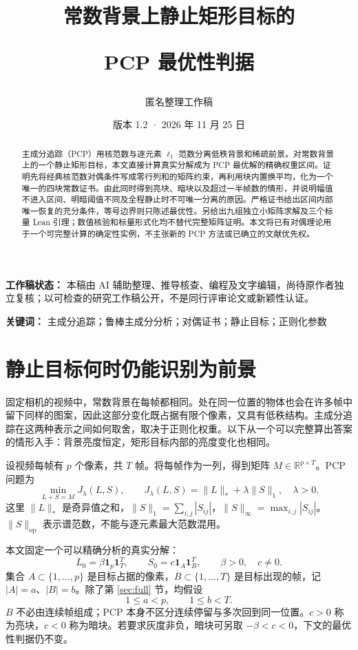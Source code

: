 \documentclass[UTF8,fontset=none,zihao=-4,a4paper]{ctexart}
\title{\vspace{-1.3em}\bfseries 常数背景上静止矩形目标的\par PCP 最优性判据}
\author{匿名整理工作稿}
\date{版本 1.2 · 2026 年 11 月 25 日}
\theoremstyle{plainzh}
\newcommand{\R}{\mathbb R}
\newcommand{\one}{\bm 1}
\newcommand{\nuc}[1]{\lVert #1\rVert_*}
\newcommand{\op}[1]{\lVert #1\rVert_{\mathrm{op}}}
\newcommand{\ellone}[1]{\lVert #1\rVert_1}
\newcommand{\maxnorm}[1]{\lVert #1\rVert_\infty}
\numberwithin{equation}{section}
\begin{document}
\maketitle
\noindent\textbf{工作稿状态：} 本稿由 AI 辅助整理、推导核查、编程及文字编辑，尚待原作者独立复核；以可检查的研究工作稿公开，不是同行评审论文或新颖性认证。\par\medskip
\begin{abstract}
主成分追踪（PCP）用核范数与逐元素 $\ell_1$ 范数分离低秩背景和稀疏前景。对常数背景上的一个静止矩形目标，本文直接计算真实分解成为 PCP 最优解的精确权重区间。证明先将经典核范数对偶条件写成零行列和的矩阵约束，再利用块内置换平均，化为一个唯一的四块常数证书。由此同时得到亮块、暗块以及超过一半帧数的情形，并说明幅值不进入区间、明暗阈值不同及全程静止时不可唯一分离的原因。严格证书给出区间内部唯一恢复的充分条件，等号边界则只陈述最优性。另给出九组独立小矩阵求解及三个标量 Lean 引理；数值核验和标量形式化均不替代完整矩阵证明。本文将已有对偶理论用于一个可完整计算的确定性实例，不主张新的 PCP 方法或已确立的文献优先权。
\end{abstract}
\noindent\textbf{关键词：} 主成分追踪；鲁棒主成分分析；对偶证书；静止目标；正则化参数

\section{静止目标何时仍能识别为前景}
固定相机的视频中，常数背景在每帧都相同。处在同一位置的物体也会在许多帧中留下同样的图案，因此这部分变化既占据有限个像素，又具有低秩结构。主成分追踪在这两种表示之间如何取舍，取决于正则化权重。以下从一个可以完整算出答案的情形入手：背景亮度恒定，矩形目标内部的亮度变化也相同。

设视频每帧有 $p$ 个像素，共 $T$ 帧。将每帧作为一列，得到矩阵 $M\in\R^{p\times T}$。PCP 问题为
\begin{equation}\label{eq:pcp}
 \min_{L+S=M}J_\lambda(L,S),\qquad
 J_\lambda(L,S)=\nuc L+\lambda\ellone S,\quad \lambda>0.
\end{equation}
这里 $\nuc L$ 是奇异值之和，$\ellone S=\sum_{i,j}|S_{ij}|$，$\maxnorm S=\max_{i,j}|S_{ij}|$。$\op S$ 表示谱范数，不能与逐元素最大范数混用。

本文固定一个可以精确分析的真实分解：
\begin{equation}\label{eq:model}
 L_0=\beta\one_p\one_T^T,\qquad
 S_0=c\one_A\one_B^T,\qquad \beta>0,\quad c\ne0.
\end{equation}
集合 $A\subset\{1,\ldots,p\}$ 是目标占据的像素，$B\subset\{1,\ldots,T\}$ 是目标出现的帧，记 $|A|=a$、$|B|=b$。除了第 \ref{sec:full} 节，均假设
\begin{equation}\label{eq:proper}
 1\le a<p,\qquad 1\le b<T.
\end{equation}
$B$ 不必由连续帧组成；PCP 本身不区分连续停留与多次回到同一位置。$c>0$ 称为亮块，$c<0$ 称为暗块。若要求灰度非负，暗块可另取 $-\beta<c<0$，下文的最优性判据仍不变。
\end{document}
